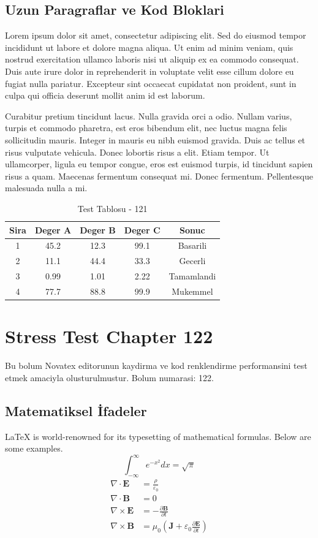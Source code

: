 \documentclass[12pt,a4paper]{article}
\begin{document}
\subsection{Uzun Paragraflar ve Kod Bloklari}
Lorem ipsum dolor sit amet, consectetur adipiscing elit. Sed do eiusmod tempor incididunt ut labore et dolore magna aliqua. Ut enim ad minim veniam, quis nostrud exercitation ullamco laboris nisi ut aliquip ex ea commodo consequat. Duis aute irure dolor in reprehenderit in voluptate velit esse cillum dolore eu fugiat nulla pariatur. Excepteur sint occaecat cupidatat non proident, sunt in culpa qui officia deserunt mollit anim id est laborum.

Curabitur pretium tincidunt lacus. Nulla gravida orci a odio. Nullam varius, turpis et commodo pharetra, est eros bibendum elit, nec luctus magna felis sollicitudin mauris. Integer in mauris eu nibh euismod gravida. Duis ac tellus et risus vulputate vehicula. Donec lobortis risus a elit. Etiam tempor. Ut ullamcorper, ligula eu tempor congue, eros est euismod turpis, id tincidunt sapien risus a quam. Maecenas fermentum consequat mi. Donec fermentum. Pellentesque malesuada nulla a mi.

\begin{table}[h!]
\centering
\begin{tabular}{|c|c|c|c|c|}
\hline
\textbf{Sira} & \textbf{Deger A} & \textbf{Deger B} & \textbf{Deger C} & \textbf{Sonuc} \\
\hline
1 & 45.2 & 12.3 & 99.1 & Basarili \\
2 & 11.1 & 44.4 & 33.3 & Gecerli \\
3 & 0.99 & 1.01 & 2.22 & Tamamlandi \\
4 & 77.7 & 88.8 & 99.9 & Mukemmel \\
\hline
\end{tabular}
\caption{Test Tablosu - 121}
\end{table}

\newpage
\section{Stress Test Chapter 122}
Bu bolum Novatex editorunun kaydirma ve kod renklendirme performansini test etmek amaciyla olusturulmustur. Bolum numarasi: 122.

\subsection{Matematiksel İfadeler}
\LaTeX{} is world-renowned for its typesetting of mathematical formulas. Below are some examples.
\begin{equation}
\int_{-\infty}^{\infty} e^{-x^2} dx = \sqrt{\pi}
\end{equation}
\begin{align}
\nabla \cdot \mathbf{E} &= \frac{\rho}{\varepsilon_0} \\
\nabla \cdot \mathbf{B} &= 0 \\
\nabla \times \mathbf{E} &= -\frac{\partial \mathbf{B}}{\partial t} \\
\nabla \times \mathbf{B} &= \mu_0\left(\mathbf{J} + \varepsilon_0 \frac{\partial \mathbf{E}}{\partial t}\right)
\end{align}
\end{document}
